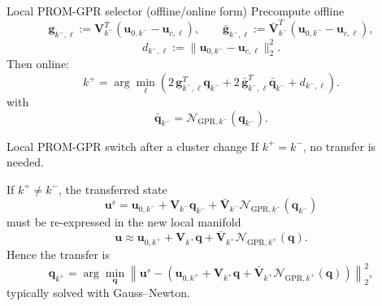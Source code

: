 \documentclass{beamer}
\begin{document}
\begin{frame}{Local PROM-GPR selector (offline/online form)}
\small
Precompute offline
\[
\mathbf g_{k^-,\ell}:=\mathbf V_{k^-}^T(\mathbf u_{0,k^-}-\mathbf u_{c,\ell}),
\qquad
\bar{\mathbf g}_{k^-,\ell}:=\bar{\mathbf V}_{k^-}^T(\mathbf u_{0,k^-}-\mathbf u_{c,\ell}),
\]
\[
d_{k^-,\ell}:=\|\mathbf u_{0,k^-}-\mathbf u_{c,\ell}\|_2^2.
\]
Then online:
\[
k^+
=
\arg\min_\ell
\left(
2\,\mathbf g_{k^-,\ell}^T\mathbf q_{k^-}
+
2\,\bar{\mathbf g}_{k^-,\ell}^T\bar{\mathbf q}_{k^-}
+
d_{k^-,\ell}
\right).
\]
with
\[
\bar{\mathbf q}_{k^-}=\mathcal N_{\mathrm{GPR},k^-}(\mathbf q_{k^-}).
\]
\end{frame}

\begin{frame}{Local PROM-GPR switch after a cluster change}
\small
If $k^+=k^-$, no transfer is needed.

If $k^+\neq k^-$, the transferred state
\[
\mathbf u^s
=
\mathbf u_{0,k^-}
+
\mathbf V_{k^-}\mathbf q_{k^-}
+
\bar{\mathbf V}_{k^-}\mathcal N_{\mathrm{GPR},k^-}(\mathbf q_{k^-})
\]
must be re-expressed in the new local manifold
\[
\mathbf u
\approx
\mathbf u_{0,k^+}
+
\mathbf V_{k^+}\mathbf q
+
\bar{\mathbf V}_{k^+}\mathcal N_{\mathrm{GPR},k^+}(\mathbf q).
\]
Hence the transfer is
\[
\mathbf q_{k^+}
=
\arg\min_{\mathbf q}
\left\|
\mathbf u^s
-
\left(
\mathbf u_{0,k^+}
+
\mathbf V_{k^+}\mathbf q
+
\bar{\mathbf V}_{k^+}\mathcal N_{\mathrm{GPR},k^+}(\mathbf q)
\right)
\right\|_2^2,
\]
typically solved with Gauss--Newton.
\end{frame}
\end{document}
